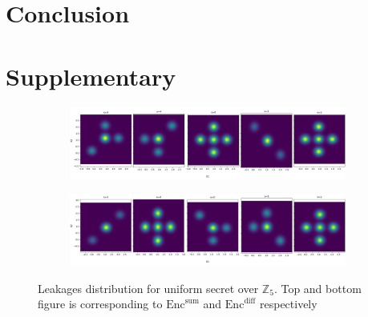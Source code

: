 \documentclass{llncs}
\begin{document}
\section{Conclusion}
\appendix
\section{Supplementary}
\begin{figure}
	\centering
	\begin{subfigure}{1\linewidth}
		\centering
		\includegraphics[scale=0.2]{figures/5_dist_sum.png}
	\end{subfigure} %
	
	\hfill
	
	\begin{subfigure}{1\linewidth}
		\includegraphics[scale=0.2]{figures/5_dist_diff.png}
	\end{subfigure}
	\caption{Leakages distribution for uniform secret over $\mathbb{Z}_5$. Top and bottom figure is corresponding to  $\text{Enc}^{\text{sum}}$ and  $\text{Enc}^{\text{diff}}$ respectively}
	\label{fig:dist5}
\end{figure}
\end{document}
